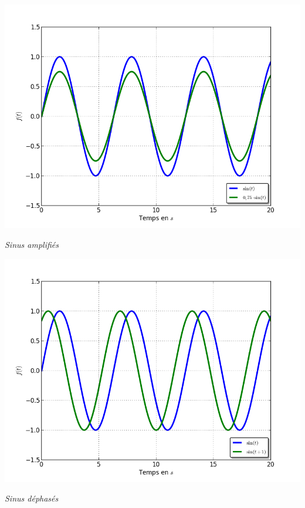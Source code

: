 \documentclass[10pt,oneside]{article}
\begin{document}
\begin{minipage}[c]{.3\linewidth}
\begin{center}
\includegraphics[width=.95\textwidth]{png/sinus_ampli}

\textit{Sinus amplifiés}
\end{center}
\end{minipage}\hfill
\begin{minipage}[c]{.3\linewidth}
\begin{center}
\includegraphics[width=.95\textwidth]{png/sinus_dephase}

\textit{Sinus déphasés}
\end{center}
\end{minipage}\hfill
\end{document}
